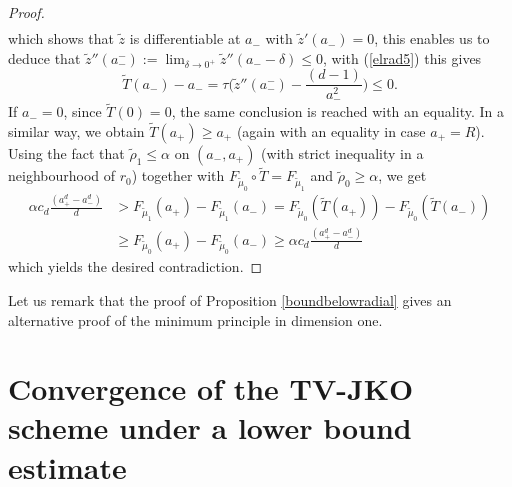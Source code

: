 \documentclass[12pt, a4paper]{article}
\numberwithin{equation}{section}
\theoremstyle{plain}
\theoremstyle{definition}
\theoremstyle{remark}
\newcommand\tilm{{\widetilde{\mu}}}
\newcommand\tilr{{\widetilde{\rho}}}
\newcommand\tilz{{\widetilde{z}}}
\newcommand\tilT{{\widetilde{T}}}
\newcommand\pref[1]{(\ref{#1})}
\begin{document}
\begin{proof}
\[\begin{split}
\end{split}\]
which shows that $\tilz$ is differentiable at $a_-$ with $\tilz '(a_-)=0$, this enables us to deduce that $\tilz''(a_-^-):=\lim_{\delta \to 0^+}  \tilz''(a_--\delta)\le 0$, with \pref{elrad5} this gives 
\[\tilT (a_-)-a_-=\tau \Big( \tilz''(a_-^-)-\frac{(d-1)}{a_-^2}\Big)  \le 0.\]
If $a_-=0$, since $\tilT(0)=0$, the same conclusion is reached with an equality. In a similar way, we obtain $\tilT(a_+)\ge a_+$ (again with an equality in case $a_+=R$). Using the fact that $\tilr_1 \le \alpha$ on $(a_-, a_+)$ (with strict inequality in a neighbourhood of $r_0$) together with $F_{\tilm_0} \circ \tilT=F_{\tilm_1}$ and $\tilr_0\ge \alpha$, we get
\[\begin{split}
\alpha c_d\frac{(a_+^d-a_-^d)}{d} &> F_{\tilm_1}(a_+)-F_{\tilm_1}(a_-) = F_{\tilm_0}( \tilT(a_+))- F_{\tilm_0}( \tilT(a_-))\\
& \ge  F_{\tilm_0}( a_+)-  F_{\tilm_0}( a_-) \ge \alpha c_d\frac{(a_+^d-a_-^d)}{d}
\end{split}\]
which yields the desired contradiction.
 





 \end{proof}
 
 Let us remark that the proof of Proposition \ref{boundbelowradial} gives an alternative proof of the minimum principle in dimension one.
 
 
 
  
\section{Convergence of the TV-JKO scheme under a lower bound estimate}\label{sec-conv} 
 
\end{document}

